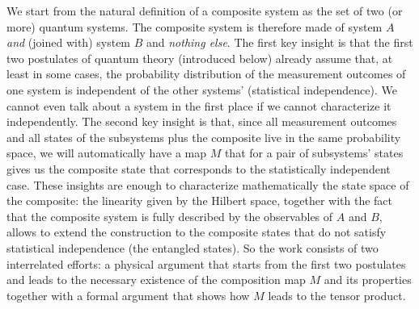 \documentclass[aps,prl,amsmath,amssymb,twocolumn]{revtex4}
\theoremstyle{plain}
\theoremstyle{definition}
\theoremstyle{remark}
\def\comment#1{}
\begin{document}
	We start
	from the natural definition of a composite system as the set of two
	(or more) quantum systems. The composite system is therefore
	made of system $A$ {\em and} (joined with) system $B$ and {\em nothing else}\comment{da mettere altrove:, namely, 
		its state is fully described by the probability amplitudes of the system's observables and nothing else}. The first key insight is that the first two postulates of quantum theory (introduced below) already assume that, at least in some cases, the probability distribution of the
	measurement outcomes of one system is independent of the other systems' (statistical independence). We cannot even talk about a system in the first place if we cannot characterize it independently. The second key insight is that, since all measurement
	outcomes and all states of the subsystems plus the composite live in the same probability space, we will automatically have a map $M$ that for a pair of subsystems' states gives us the composite state that corresponds to the statistically independent case. These insights are enough to characterize mathematically the state space of the composite: the linearity given by the Hilbert space, together with the fact that the composite system is fully described by the observables of $A$ and $B$, allows to extend the construction to the composite states that do not satisfy statistical independence (the entangled states). So the work consists of two interrelated efforts: a physical argument that starts from the first two postulates and leads to the necessary existence of the composition map $M$ and its properties together with a formal argument that shows how $M$ leads to the tensor product.
	
	\comment{mettere nel supplementary:	We will mainly focus on
		kine\-mati\-cal\-ly-inde\-pen\-dent systems, namely no superselection rules or
		other restrictions to the state space are present: it is possible to
		prepare each subsystem of a composite system in a state that is
		independent of the other systems (preparation independence).  This is
		the only case in which the tensor product can be properly employed: the Hilbert space of composite
		systems that have restrictions is {\em not} the tensor product of the
		component spaces, but a subspace of it (e.g.~the anti-symmetric
		subspace for fermions). Typically this is ignored in the literature,
		since the tensor product formalism is very convenient and is often
		used also in these cases, and superselection rules are typically avoidable \cite{susskind,zanardi,zanardilloyd}. }
	
\end{document}
